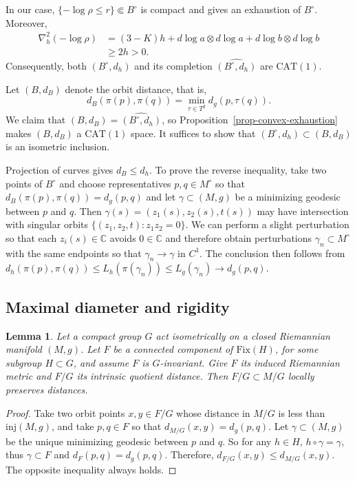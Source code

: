 \documentclass[letterpaper]{amsart}
\newtheorem{lem}[thm]{Lemma}
\theoremstyle{definition}
\theoremstyle{remark}
\begin{document}
In our case, $\{ - \log \rho\leq  r\} \Subset B ^{\circ}$ is compact and gives an exhaustion of $B ^{\circ}$. Moreover,
\begin{align*}
	\nabla ^2_h (- \log \rho)   &= (3-K) h + d \log a \otimes d \log a + d \log b \otimes d \log b \\
		      & \geq 2 h>0.
\end{align*} 
Consequently, both $(B ^{\circ}, d_h)$ and its completion $\widehat{(B ^{\circ}, d_h)}$ are $\mathrm{CAT}(1)$. 

Let $(B, d_B)$ denote the orbit distance, that is,
\[
d_B( \pi (p), \pi (q) ) = \min_{\tau \in T^2}d_g(p, \tau (q) ).
\]
We claim that $(B,d_B)=\widehat{(B^\circ,d_h)}$, so Proposition~\ref{prop-convex-exhaustion} makes $(B,d_B)$ a $\mathrm{CAT}(1)$ space. It suffices to show that $(B ^{\circ}, d_h) \subset (B, d_B)$ is an isometric inclusion. 

Projection of curves gives $d_B\le d_h$. To prove the reverse inequality, take two points of $B^\circ$ and choose representatives $p,q\in M^\circ$ so that $d_{B}(\pi (p), \pi (q) ) = d_{g}(p,q)$ and let $\gamma \subset (M, g)$ be a minimizing geodesic between $p$ and $q$. Then $\gamma (s) = (z_1(s), z_2(s), t(s) ) $ may have intersection with singular orbits $\{ (z_1, z_2, t): z_1 z_2 =0\} $. We can perform a slight perturbation so that each $z_i(s) \in \mathbb{C}$ avoids $0 \in \mathbb{C}$ and therefore obtain perturbations $\gamma _n \subset M ^{\circ}$ with the same endpoints so that $\gamma _n \to \gamma $ in $C^1$. The conclusion then follows from $d_h(\pi (p), \pi (q) ) \leq L_{h}(\pi (\gamma _n) ) \leq L_{g}(\gamma _n) \to d_{g}(p, q) $.

\subsection{Maximal diameter and rigidity}
\begin{lem}\label{lem-fixed-quotient}
	Let a compact group $G$ act isometrically on a closed Riemannian manifold $(M, g)$. Let $F$ be a connected component of $\mathrm{Fix}(H)$, for some subgroup $H \subset G$, and assume $F$ is $G$-invariant.
Give $F$ its induced Riemannian metric and $F / G$ its intrinsic quotient distance. Then
$F / G \subset M / G$ 
locally preserves distances.
\end{lem}
\begin{proof}
	Take two orbit points $x, y \in F / G$ whose distance in $M / G$ is less than $\mathrm{inj}(M,g)$, and take $p, q \in F$ so that $d_{M / G}(x, y) = d_g(p, q)$. Let $\gamma \subset (M,g)$ be the unique minimizing geodesic between $p$ and $q$. So for any $h \in H$, $h\circ \gamma = \gamma $, thus $\gamma \subset F$ and $d_{F}(p,q) = d_g(p, q)$. Therefore, $d_{F / G}(x, y) \leq d_{M / G}(x, y)$. The opposite inequality always holds.
\end{proof}
\end{document}
